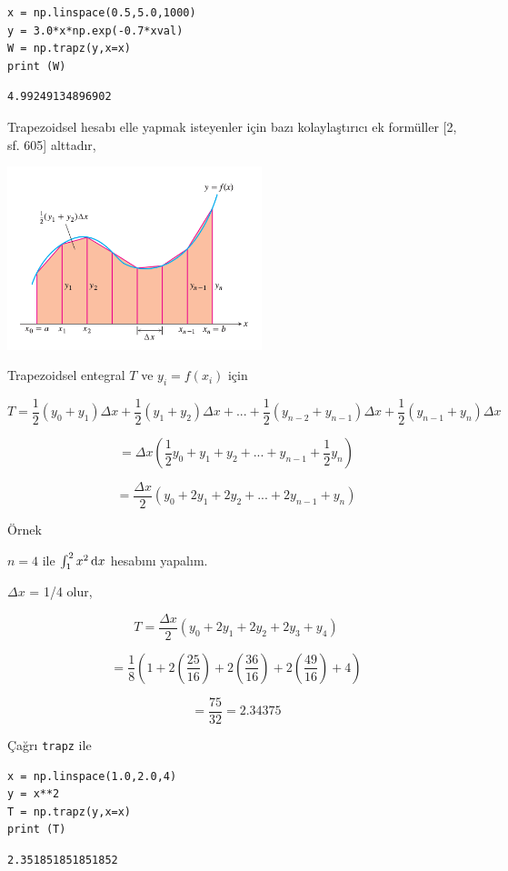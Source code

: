 \documentclass[12pt,fleqn]{article}\usepackage{../../common}
\begin{document}
\begin{verbatim}
x = np.linspace(0.5,5.0,1000)
y = 3.0*x*np.exp(-0.7*xval)
W = np.trapz(y,x=x)
print (W)
\end{verbatim}

\begin{verbatim}
4.99249134896902
\end{verbatim}

Trapezoidsel hesabı elle yapmak isteyenler için bazı kolaylaştırıcı ek
formüller [2, sf. 605] alttadır,

\includegraphics[width=20em]{compscieng_app01numint_02.png}

Trapezoidsel entegral $T$ ve $y_i = f(x_i)$ için 

$$
T = \frac{1}{2} (y_0 + y_1)\Delta x + \frac{1}{2} (y_1 + y_2)\Delta x +... +
\frac{1}{2} (y_{n-2} + y_{n-1})\Delta x + \frac{1}{2} (y_{n-1} + y_n)\Delta x
$$

$$
= \Delta x (\frac{1}{2}y_0 + y_1 + y_2 + ... + y_{n-1} + \frac{1}{2} y_n )
$$

$$
= \frac{\Delta x}{2} (y_0 + 2y_1 + 2y_2 + ... + 2y_{n-1} + y_n)
$$

Örnek

$n=4$ ile  $\int_{1}^{2} x^2 \,\mathrm{d} x$ hesabını yapalım. 

$\Delta x$ = 1/4 olur,

$$
T = \frac{\Delta x}{2} (y_0 + 2y_1 + 2y_2 + 2y_3 + y_4)
$$

$$
= \frac{1}{8} (1 + 2 (\frac{25}{16}) + 2(\frac{36}{16}) + 2 (\frac{49}{16}) + 4)
$$

$$
= \frac{75}{32} = 2.34375
$$

Çağrı \verb!trapz! ile

\begin{verbatim}
x = np.linspace(1.0,2.0,4)
y = x**2
T = np.trapz(y,x=x)
print (T)
\end{verbatim}

\begin{verbatim}
2.351851851851852
\end{verbatim}
\end{document}

